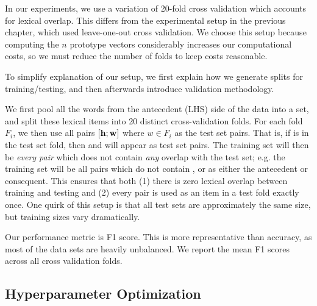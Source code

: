 In our experiments, we use a variation of 20-fold cross validation which
accounts for lexical overlap. This differs from the experimental setup in the
previous chapter, which used leave-one-out cross validation. We choose this
setup because computing the $n$ prototype vectors considerably increases our
computational costs, so we must reduce the number of folds to keep costs
reasonable.

To simplify explanation of our setup, we first explain how we
generate splits for training/testing, and then afterwards introduce validation
methodology.

We first pool all the words from the antecedent (LHS)
side of the data into a set, and split these lexical items into 20 distinct
cross-validation folds. For each fold $F_i$, we then use all pairs $[{\mathbf{h}}; {\mathbf{w}}]$ where
$w\in F_i$ as the test set pairs. That is, if  is in the test set fold,
then  and  will appear
as test set pairs. The training set will then be {\em every pair} which does
not contain {\em any} overlap with the test set; e.g. the training
set will be all pairs which do not contain ,  or 
as either the antecedent or consequent. This ensures that both (1) there
is zero lexical overlap between training and testing and (2) every pair is
used as an item in a test fold exactly once. One quirk of this setup is
that all test sets are approximately the same size, but training sizes
vary dramatically.


Our performance metric is F1 score. This is more representative than
accuracy, as most of the data sets are heavily unbalanced. We report the mean
F1 scores across all cross validation folds.

\subsection{Hyperparameter Optimization}

